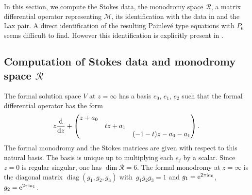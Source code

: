 \documentclass[10pt,a4paper]{amsart}
\numberwithin{equation}{section}
\begin{document}
 In this section, we compute the Stokes data, the monodromy space $\mathcal{R}$, a matrix differential operator
 representing $\mathcal{M}$, its identification with the data in \cite{D-G,H, Maz} and the Lax pair.
 A direct identification of the resulting Painlev\'e type equations with $P_6$ seems difficult to find. However
 this identification is explicitly present in \cite{H, Maz}.

 \subsection[Computation of Stokes data and monodromy space R]{Computation of Stokes data and monodromy space $\boldsymbol{\mathcal{R}}$}

The formal solution space $V$ at $z=\infty$ has a basis $e_0$, $e_1$, $e_2$ such that the formal differential operator has the form
\[ z\frac{{\rm d}}{{\rm d}z}+\begin{pmatrix} z+a_0 & & \\ &tz +a_1& \\ & &(-1-t)z-a_0-a_1 \end{pmatrix}.\]
The formal monodromy and the Stokes matrices are given with respect to this natural basis.
The basis is unique up to multiplying each $e_j$ by a scalar. Since $z=0$ is regular singular, one has $\dim \mathcal{R}=6$.
 The formal monodromy at $z=\infty$ is the diagonal matrix $\operatorname{diag}(g_1,g_2,g_3)$
 with~${g_1g_2g_3=1}$ and $g_1={\rm e}^{2\pi {\rm i} a_0}$, $g_2={\rm e}^{2\pi {\rm i} a_1}$.
\end{document}
